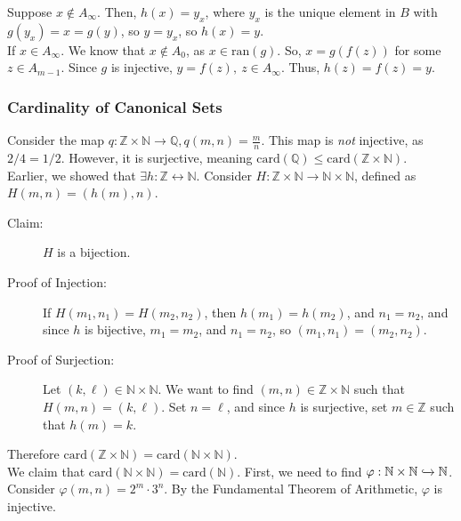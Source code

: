 \documentclass[10pt]{extarticle}
\begin{document}
\begin{description}
\begin{description}
              Suppose $x\notin A_{\infty}$. Then, $h(x) = y_x$, where $y_x$ is the unique element in $B$ with $g(y_x)=x=g(y)$, so $y = y_x$, so $h(x) = y$.\\

              If $x\in A_{\infty}$. We know that $x\notin A_0$, as $x\in \text{ran}(g)$. So, $x = g(f(z))$ for some $z\in A_{m-1}$. Since $g$ is injective, $y = f(z),~z\in A_{\infty}$. Thus, $h(z) = f(z) = y$.
          \end{description}
      \end{description}
      \subsubsection{Cardinality of Canonical Sets}%
      Consider the map $q: \mathbb{Z} \times \mathbb{N} \rightarrow \mathbb{Q}, q(m,n) = \frac{m}{n}$. This map is \textsl{not} injective, as $2/4 = 1/2$. However, it is surjective, meaning $\text{card}(\mathbb{Q}) \leq \text{card}(\mathbb{Z} \times \mathbb{N})$.\\

      Earlier, we showed that $\exists h: \mathbb{Z} \leftrightarrow \mathbb{N}$. Consider $H: \mathbb{Z} \times \mathbb{N} \rightarrow \mathbb{N} \times\mathbb{N}$, defined as $H(m,n) = (h(m),n)$. 
      \begin{description}
        \item[Claim:] $H$ is a bijection.
        \item[Proof of Injection:] If $H(m_1,n_1) = H(m_2,n_2)$, then $h(m_1) = h(m_2)$, and $n_1 = n_2$, and since $h$ is bijective, $m_1 = m_2$, and $n_1 = n_2$, so $(m_1,n_1) = (m_2,n_2)$.
        \item[Proof of Surjection:] Let $(k,\ell)\in \mathbb{N} \times \mathbb{N}$. We want to find $(m,n)\in \mathbb{Z}\times \mathbb{N}$ such that $H(m,n) = (k,\ell)$. Set $n = \ell$, and since $h$ is surjective, set $m\in \mathbb{Z}$ such that $h(m) = k$.
      \end{description}
      Therefore $\text{card}(\mathbb{Z} \times \mathbb{N}) = \text{card}(\mathbb{N}\times \mathbb{N})$.\\

      We claim that $\text{card}(\mathbb{N} \times \mathbb{N}) = \text{card}(\mathbb{N})$. First, we need to find $\varphi: \mathbb{N}\times \mathbb{N} \xhookrightarrow{} \mathbb{N}$. Consider $\varphi(m,n) = 2^m\cdot 3^n$. By the Fundamental Theorem of Arithmetic, $\varphi$ is injective.\\
\end{document}
